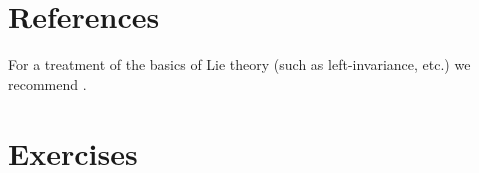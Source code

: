 \section{References}

For a treatment of the basics of Lie theory (such as left-invariance, etc.) we recommend \cite{Lee}.

\section{Exercises}


